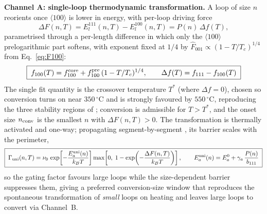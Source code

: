 \textbf{Channel A: single-loop thermodynamic transformation.}
\label{sec:channel-A}
A loop of size $n$ reorients once $\langle100\rangle$ is lower in energy, with
per-loop driving force
\begin{equation}
  \Delta F(n,T) = E_l^{111}(n,T) - E_l^{100}(n,T) = P(n)\,\Delta f(T),
  \label{eq:driving-force}
\end{equation}
parametrised through a per-length difference in which only the
$\langle100\rangle$ prelogarithmic part softens, with exponent fixed at $1/4$ by
$\hat F_{001}\propto(1-T/T_c)^{1/4}$ from Eq.~\eqref{eq:F100}:
\begin{equation}
  \boxed{\;f_{100}(T)=f_{100}^{\rm core}+f_{100}^{\rm pre}\,(1-T/T_c)^{1/4},
  \qquad \Delta f(T) = f_{111} - f_{100}(T)\;}
  \label{eq:delta-f}
\end{equation}
The single fit quantity is the crossover temperature $T^\ast$ (where
$\Delta f=0$), chosen so conversion turns on near $350\,^\circ$C and is strongly
favoured by $550\,^\circ$C, reproducing the three stability regions of
\cite{Dudarev2008}; conversion is admissible for $T>T^\ast$, and the onset size
$n_{\rm conv}$ is the smallest $n$ with $\Delta F(n,T)>0$. The transformation is
thermally activated and one-way; propagating segment-by-segment
\citep{Marian2002}, its barrier scales with the perimeter,
\begin{equation}
  \boxed{\;\Gamma_{\rm uni}(n,T) = \nu_0\,
    \exp\!\left[-\frac{E_a^{\rm uni}(n)}{k_BT}\right]
    \max\!\left[0,\;1-\exp\!\left(-\frac{\Delta F(n,T)}{k_BT}\right)\right],\qquad
    E_a^{\rm uni}(n) = E_a^{0} + \gamma_a\,\frac{P(n)}{b_{111}}\;}
  \label{eq:gamma-uni}
\end{equation}
so the gating factor favours large loops while the size-dependent barrier
suppresses them, giving a preferred conversion-size window that reproduces the
spontaneous transformation of \emph{small} loops on heating \citep{Arakawa2006}
and leaves large loops to convert via Channel~B.

